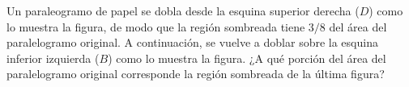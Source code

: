 Un paraleogramo de papel se dobla desde la esquina superior derecha ($D$) como lo muestra la figura, de modo que la región sombreada tiene $3/8$ del área del paralelogramo original. A continuación, se vuelve a doblar sobre la esquina inferior izquierda ($B$) como lo muestra la figura. ¿A qué porción del área del paralelogramo original corresponde la región sombreada de la última figura?